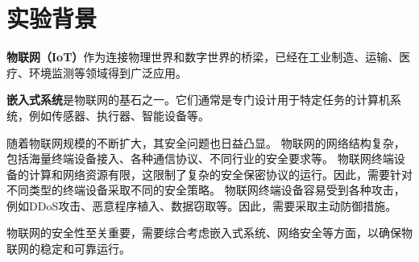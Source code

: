 \documentclass[../main.tex]{subfiles}
\begin{document}
\section{实验背景}
\textbf{物联网（IoT）}作为连接物理世界和数字世界的桥梁，已经在工业制造、运输、医疗、环境监测等领域得到广泛应用。

\textbf{嵌入式系统}是物联网的基石之一。它们通常是专门设计用于特定任务的计算机系统，例如传感器、执行器、智能设备等。

随着物联网规模的不断扩大，其安全问题也日益凸显。
物联网的网络结构复杂，包括海量终端设备接入、各种通信协议、不同行业的安全要求等。
物联网终端设备的计算和网络资源有限，这限制了复杂的安全保密协议的运行。因此，需要针对不同类型的终端设备采取不同的安全策略。
物联网终端设备容易受到各种攻击，例如DDoS攻击、恶意程序植入、数据窃取等。因此，需要采取主动防御措施。

物联网的安全性至关重要，需要综合考虑嵌入式系统、网络安全等方面，以确保物联网的稳定和可靠运行。
\end{document}
